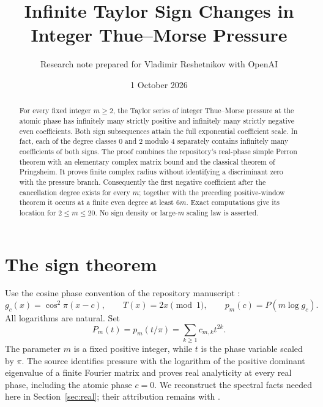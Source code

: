 \documentclass[11pt,a4paper]{article}
\title{Infinite Taylor Sign Changes in\\Integer Thue--Morse Pressure}
\author{Research note prepared for Vladimir Reshetnikov with OpenAI}
\date{1 October 2026}
\theoremstyle{remark}\newtheorem*{ednote}{Editorial note (ProveIt, 2026-10-01)}
\begin{document}
\maketitle
\begin{abstract}
For every fixed integer $m\ge2$, the Taylor series of integer Thue--Morse pressure at the atomic phase has infinitely many strictly positive and infinitely many strictly negative even coefficients.
Both sign subsequences attain the full exponential coefficient scale.
In fact, each of the degree classes $0$ and $2$ modulo $4$ separately contains infinitely many coefficients of both signs.
The proof combines the repository's real-phase simple Perron theorem with an elementary complex matrix bound and the classical theorem of Pringsheim.
It proves finite complex radius without identifying a discriminant zero with the pressure branch.
Consequently the first negative coefficient after the cancellation degree exists for every $m$; together with the preceding positive-window theorem it occurs at a finite even degree at least $6m$.
Exact computations give its location for $2\le m\le20$.
No sign density or large-$m$ scaling law is asserted.
\end{abstract}

\section{The sign theorem}
Use the cosine phase convention of the repository manuscript \cite{Repo}:
\[
 g_c(x)=\cos^2\!\pi(x-c),\qquad T(x)=2x\pmod1,\qquad
 p_m(c)=P(m\log g_c).
\]
All logarithms are natural. Set
\[
 P_m(t)=p_m(t/\pi)=\sum_{k\ge1}c_{m,k}t^{2k}.
\]
The parameter $m$ is a fixed positive integer, while $t$ is the phase variable scaled by $\pi$.
The source identifies pressure with the logarithm of the positive dominant eigenvalue of a finite Fourier matrix and proves real analyticity at every real phase, including the atomic phase $c=0$.
We reconstruct the spectral facts needed here in Section~\ref{sec:real}; their attribution remains with \cite{Repo}.
\end{document}
